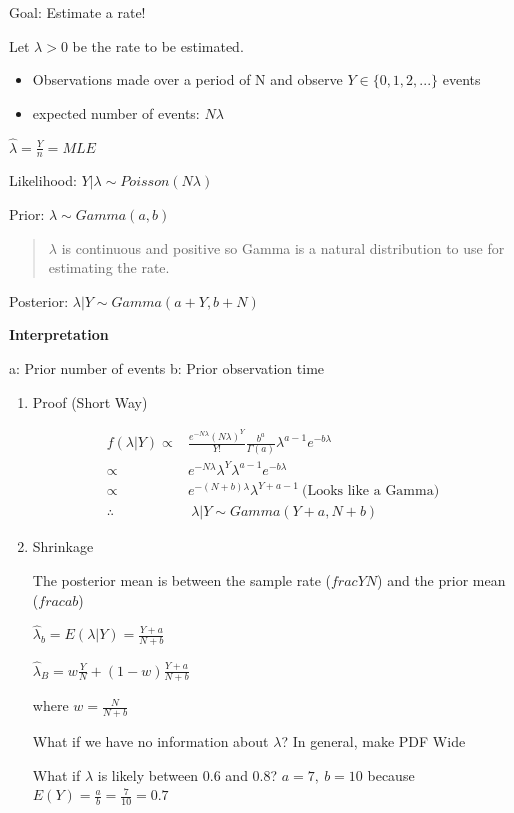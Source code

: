\documentclass[11pt]{article}
\begin{document}
Goal: Estimate a rate!

Let \(\lambda > 0\) be the rate to be estimated.

\begin{itemize}
\item Observations made over a period of N and observe \(Y \in \{0,1,2,...\}\) events
\item expected number of events: \(N \lambda\)
\end{itemize}

\(\hat \lambda = \frac{Y}{n} = MLE\)

Likelihood: \(Y | \lambda \sim Poisson(N \lambda)\)

Prior: \(\lambda \sim Gamma(a, b)\)

\begin{quote}
\(\lambda\) is continuous and positive so Gamma is a natural distribution to use
for estimating the rate.
\end{quote}

Posterior: \(\lambda | Y \sim Gamma(a + Y, b + N)\)

\textbf{Interpretation}

a: Prior number of events
b: Prior observation time

\begin{enumerate}
\item Proof (Short Way)
\label{sec:org98b0687}

\begin{equation}
\begin{split}
f(\lambda | Y) \propto & \frac{e^{-N \lambda} (N \lambda)^Y}{Y !} \frac{b^a}{\Gamma (a)} \lambda^{a - 1} e^{-b \lambda}\\
\propto & e^{-N \lambda} \lambda^Y  \lambda^{a - 1} e^{-b \lambda}\\
\propto & e^{-(N + b)\lambda} \lambda^{Y + a - 1} \label{eq:3} \ \text{(Looks like a Gamma)}\\
\therefore & \ \lambda | Y \sim Gamma(Y + a, N + b)
\end{split}
\end{equation}


\item Shrinkage
\label{sec:org87c04f7}

The posterior mean is between the sample rate (\(frac{Y}{N}\)) and the prior mean
(\(frac{a}{b}\))

\(\hat \lambda_b = E(\lambda | Y) = \frac{Y + a}{N + b}\)

\(\hat \lambda_B = w \frac{Y}{N} + (1 - w) \frac{Y + a}{N + b}\)

where \(w = \frac{N}{N + b}\)


What if we have no information about \(\lambda\)? In general, make PDF Wide

What if \(\lambda\) is likely between 0.6 and 0.8? \(a = 7, \ b = 10\) because
\(E(Y) = \frac{a}{b} = \frac{7}{10} = 0.7\)
\end{enumerate}
\end{document}
